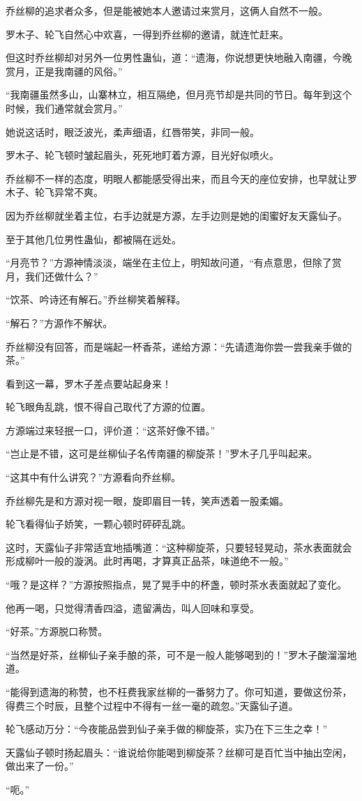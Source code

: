 \begin{this_body}
乔丝柳的追求者众多，但是能被她本人邀请过来赏月，这俩人自然不一般。

罗木子、轮飞自然心中欢喜，一得到乔丝柳的邀请，就连忙赶来。

但这时乔丝柳却对另外一位男性蛊仙，道：“遗海，你说想更快地融入南疆，今晚赏月，正是我南疆的风俗。”

“我南疆虽然多山，山寨林立，相互隔绝，但月亮节却是共同的节日。每年到这个时候，我们通常就会赏月。”

她说这话时，眼泛波光，柔声细语，红唇带笑，非同一般。

罗木子、轮飞顿时皱起眉头，死死地盯着方源，目光好似喷火。

乔丝柳不一样的态度，明眼人都能感受得出来，而且今天的座位安排，也早就让罗木子、轮飞异常不爽。

因为乔丝柳就坐着主位，右手边就是方源，左手边则是她的闺蜜好友天露仙子。

至于其他几位男性蛊仙，都被隔在远处。

“月亮节？”方源神情淡淡，端坐在主位上，明知故问道，“有点意思，但除了赏月，我们还做什么？”

“饮茶、吟诗还有解石。”乔丝柳笑着解释。

“解石？”方源作不解状。

乔丝柳没有回答，而是端起一杯香茶，递给方源：“先请遗海你尝一尝我亲手做的茶。”

看到这一幕，罗木子差点要站起身来！

轮飞眼角乱跳，恨不得自己取代了方源的位置。

方源端过来轻抿一口，评价道：“这茶好像不错。”

“岂止是不错，这可是丝柳仙子名传南疆的柳旋茶！”罗木子几乎叫起来。

“这其中有什么讲究？”方源看向乔丝柳。

乔丝柳先是和方源对视一眼，旋即眉目一转，笑声透着一股柔媚。

轮飞看得仙子娇笑，一颗心顿时砰砰乱跳。

这时，天露仙子非常适宜地插嘴道：“这种柳旋茶，只要轻轻晃动，茶水表面就会形成柳叶一般的漩涡。此时再喝，才算真正品茶，味道绝不一般。”

“哦？是这样？”方源按照指点，晃了晃手中的杯盏，顿时茶水表面就起了变化。

他再一喝，只觉得清香四溢，遗留满齿，叫人回味和享受。

“好茶。”方源脱口称赞。

“当然是好茶，丝柳仙子亲手酿的茶，可不是一般人能够喝到的！”罗木子酸溜溜地道。

“能得到遗海的称赞，也不枉费我家丝柳的一番努力了。你可知道，要做这份茶，得费三个时辰，且整个过程中不得有一丝一毫的疏忽。”天露仙子道。

轮飞感动万分：“今夜能品尝到仙子亲手做的柳旋茶，实乃在下三生之幸！”

天露仙子顿时扬起眉头：“谁说给你能喝到柳旋茶？丝柳可是百忙当中抽出空闲，做出来了一份。”

“呃。”

\end{this_body}

